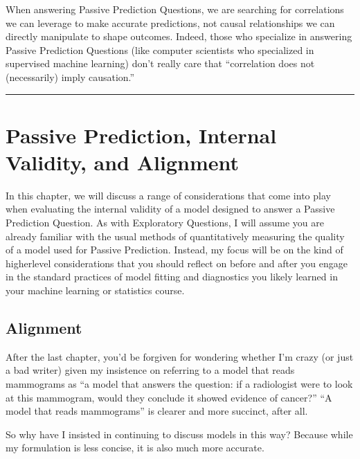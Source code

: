 \documentclass[letterpaper,10pt,english]{jupyterBook}
\begin{document}
\sphinxAtStartPar
When answering Passive Prediction Questions, we are searching for correlations we can leverage to make accurate predictions, not causal relationships we can directly manipulate to shape outcomes. Indeed, those who specialize in answering Passive Prediction Questions (like computer scientists who specialized in supervised machine learning) don’t really care that “correlation does not (necessarily) imply causation.”

\sphinxAtStartPar
{}


\bigskip\hrule\bigskip


\sphinxstepscope


\chapter{Passive Prediction, Internal Validity, and Alignment}
\label{\detokenize{30_questions/23_passive_internal_alignment_and_bias:passive-prediction-internal-validity-and-alignment}}\label{\detokenize{30_questions/23_passive_internal_alignment_and_bias::doc}}
\sphinxAtStartPar
In this chapter, we will discuss a range of considerations that come into play when evaluating the internal validity of a model designed to answer a Passive Prediction Question. As with Exploratory Questions, I will assume you are already familiar with the usual methods of quantitatively measuring the quality of a model used for Passive Prediction. Instead, my focus will be on the kind of higher\sphinxhyphen{}level considerations that you should reflect on before and after you engage in the standard practices of model fitting and diagnostics you likely learned in your machine learning or statistics course.


\section{Alignment}
\label{\detokenize{30_questions/23_passive_internal_alignment_and_bias:alignment}}
\sphinxAtStartPar
After the last chapter, you’d be forgiven for wondering whether I’m crazy (or just a bad writer) given my insistence on referring to a model that reads mammograms as “a model that answers the question: if a radiologist were to look at this mammogram, would they conclude it showed evidence of cancer?” “A model that reads mammograms” is clearer and more succinct, after all.

\sphinxAtStartPar
So why have I insisted in continuing to discuss models in this way? Because while my formulation is less concise, it is also much more accurate.
\end{document}
